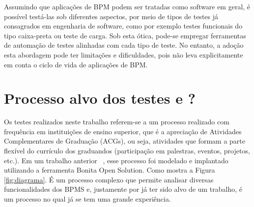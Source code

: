 \documentclass[12pt]{article}
\begin{document}
Assumindo que aplicações de BPM podem ser tratadas como software em geral, é possível testá-las sob diferentes aspectos, por meio de tipos de testes já consagrados em engenharia de software, como por exemplo testes funcionais do tipo caixa-preta ou teste de carga. Sob esta ótica, pode-se empregar ferramentas de automação de testes alinhadas com cada tipo de teste. No entanto, a adoção esta abordagem pode ter limitações e dificuldades, pois não leva explicitamente em conta o ciclo de vida de aplicações de BPM.











\section{Processo alvo dos testes e ?}
Os testes realizados neste trabalho referem-se a um processo realizado com frequência em instituições de ensino superior, que é a apreciação de Atividades Complementares de Graduação (ACGs), ou seja, atividades que formam a parte flexível do currículo dos graduandos (participação em palestras, eventos, projetos, etc.). Em um trabalho anterior ~\cite{sbsi2013}, esse processo foi modelado e implantado utilizando a ferramenta Bonita Open Solution. Como mostra a Figura \ref{fig:diagrama}. É um processo complexo que permite analisar diversas funcionalidades dos BPMS e, justamente por já ter sido alvo de um trabalho, é um processo no qual já se tem uma grande experiência.
\end{document}
